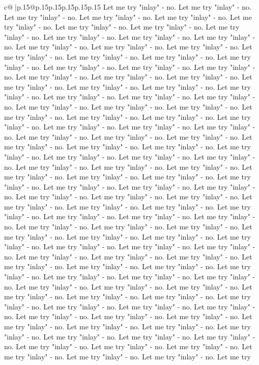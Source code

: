 \documentclass{article}
\begin{document}
{\begin{supertabular}{c@{$\;$}|p{.15\linewidth}@{}p{.15\linewidth}p{.15\linewidth}p{.15\linewidth}p{.15\linewidth}p{.15\linewidth}}
{{{Let me try "inlay" {-} no. Let me try "inlay" {-} no. Let me try "inlay" {-} no. Let me try "inlay" {-} no. Let me try "inlay" {-} no. Let me try "inlay" {-} no. Let me try "inlay" {-} no. Let me try "inlay" {-} no. Let me try "inlay" {-} no. Let me try "inlay" {-} no. Let me try "inlay" {-} no. Let me try "inlay" {-} no. Let me try "inlay" {-} no. Let me try "inlay" {-} no. Let me try "inlay" {-} no. Let me try "inlay" {-} no. Let me try "inlay" {-} no. Let me try "inlay" {-} no. Let me try "inlay" {-} no. Let me try "inlay" {-} no. Let me try "inlay" {-} no. Let me try "inlay" {-} no. Let me try "inlay" {-} no. Let me try "inlay" {-} no. Let me try "inlay" {-} no. Let me try "inlay" {-} no. Let me try "inlay" {-} no. Let me try "inlay" {-} no. Let me try "inlay" {-} no. Let me try "inlay" {-} no. Let me try "inlay" {-} no. Let me try "inlay" {-} no. Let me try "inlay" {-} no. Let me try "inlay" {-} no. Let me try "inlay" {-} no. Let me try "inlay" {-} no. Let me try "inlay" {-} no. Let me try "inlay" {-} no. Let me try "inlay" {-} no. Let me try "inlay" {-} no. Let me try "inlay" {-} no. Let me try "inlay" {-} no. Let me try "inlay" {-} no. Let me try "inlay" {-} no. Let me try "inlay" {-} no. Let me try "inlay" {-} no. Let me try "inlay" {-} no. Let me try "inlay" {-} no. Let me try "inlay" {-} no. Let me try "inlay" {-} no. Let me try "inlay" {-} no. Let me try "inlay" {-} no. Let me try "inlay" {-} no. Let me try "inlay" {-} no. Let me try "inlay" {-} no. Let me try "inlay" {-} no. Let me try "inlay" {-} no. Let me try "inlay" {-} no. Let me try "inlay" {-} no. Let me try "inlay" {-} no. Let me try "inlay" {-} no. Let me try "inlay" {-} no. Let me try "inlay" {-} no. Let me try "inlay" {-} no. Let me try "inlay" {-} no. Let me try "inlay" {-} no. Let me try "inlay" {-} no. Let me try "inlay" {-} no. Let me try "inlay" {-} no. Let me try "inlay" {-} no. Let me try "inlay" {-} no. Let me try "inlay" {-} no. Let me try "inlay" {-} no. Let me try "inlay" {-} no. Let me try "inlay" {-} no. Let me try "inlay" {-} no. Let me try "inlay" {-} no. Let me try "inlay" {-} no. Let me try "inlay" {-} no. Let me try "inlay" {-} no. Let me try "inlay" {-} no. Let me try "inlay" {-} no. Let me try "inlay" {-} no. Let me try "inlay" {-} no. Let me try "inlay" {-} no. Let me try "inlay" {-} no. Let me try "inlay" {-} no. Let me try "inlay" {-} no. Let me try "inlay" {-} no. Let me try "inlay" {-} no. Let me try "inlay" {-} no. Let me try "inlay" {-} no. Let me try "inlay" {-} no. Let me try "inlay" {-} no. Let me try "inlay" {-} no. Let me try "inlay" {-} no. Let me try "inlay" {-} no. Let me try "inlay" {-} no. Let me try "inlay" {-} no. Let me try "inlay" {-} no. Let me try "inlay" {-} no. Let me try "inlay" {-} no. Let me try "inlay" {-} no. Let me try "inlay" {-} no. Let me try "inlay" {-} no. Let me try "inlay" {-} no. Let me try "inlay" {-} no. Let me try "inlay" {-} no. Let me try "inlay" {-} no. Let me try "inlay" {-} no. Let me try "inlay" {-} no. Let me try "inlay" {-} no. Let me try "inlay" {-} no. Let me try "inlay" {-} no. Let me try "inlay" {-} no. Let me try "inlay" {-} no. Let me try "inlay" {-} no. Let me try "inlay" {-} no. Let me try }}}
\end{supertabular}}
\end{document}
